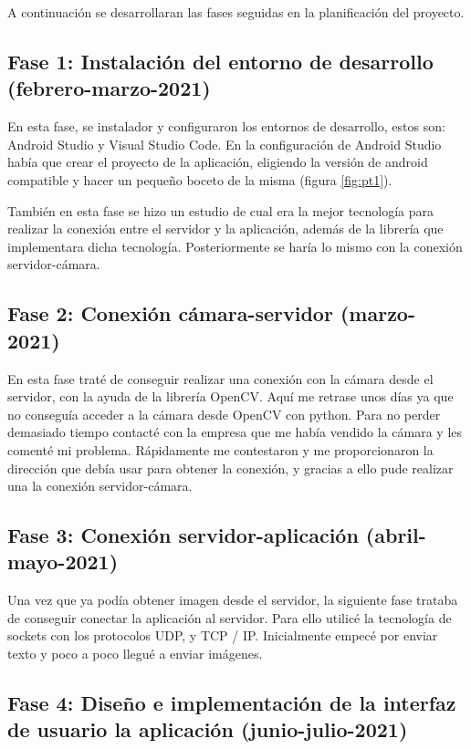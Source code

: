 A continuación se desarrollaran las fases seguidas en la planificación del proyecto.

\subsection{Fase 1: Instalación del entorno de desarrollo (febrero-marzo-2021)}

En esta fase, se instalador y configuraron los entornos de desarrollo, estos son: Android Studio y Visual Studio Code. 
En la configuración de Android Studio había que crear el proyecto de la aplicación, eligiendo la versión de android compatible y hacer un pequeño boceto de la misma (figura \ref{fig:pt1}). 


También en esta fase se hizo un estudio de cual era la mejor tecnología para realizar la conexión entre el servidor y la aplicación, además de la librería que implementara dicha tecnología.
Posteriormente se haría lo mismo con la conexión servidor-cámara.

\subsection{Fase 2: Conexión cámara-servidor (marzo-2021)}

En esta fase traté de conseguir realizar una conexión con la cámara desde el servidor, con la ayuda de la librería OpenCV. 
Aquí me retrase unos días ya que no conseguía acceder a la cámara desde OpenCV con python. 
Para no perder demasiado tiempo contacté con la empresa que me había vendido la cámara y les comenté mi problema.
Rápidamente me contestaron y me proporcionaron la dirección que debía usar para obtener la conexión, y gracias a ello pude realizar una la conexión servidor-cámara.

\subsection{Fase 3: Conexión servidor-aplicación (abril-mayo-2021)}

Una vez que ya podía obtener imagen desde el servidor, la siguiente fase trataba de conseguir conectar la aplicación al servidor.
Para ello utilicé la tecnología de sockets con los protocolos UDP, y TCP / IP.
Inicialmente empecé por enviar texto y poco a poco llegué a enviar imágenes.

\subsection{Fase 4: Diseño e implementación de la interfaz de usuario la aplicación (junio-julio-2021)}


